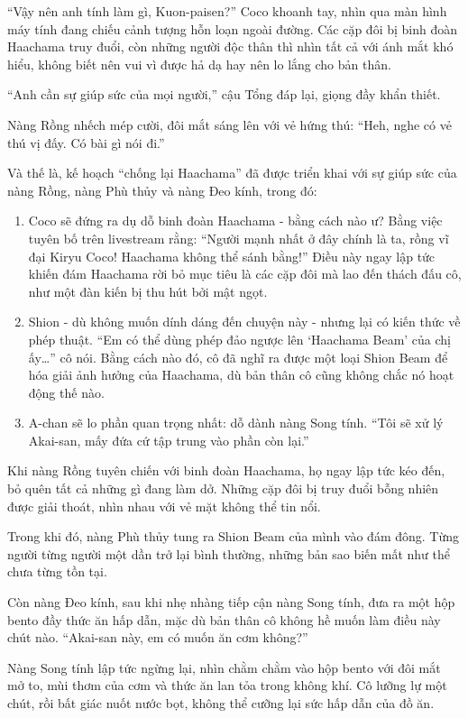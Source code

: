 \documentclass[../main.tex]{subfiles}
\begin{document}
``Vậy nên anh tính làm gì, Kuon-paisen?'' Coco khoanh tay, nhìn qua màn hình máy tính đang chiếu cảnh tượng hỗn loạn ngoài đường. Các cặp đôi bị binh đoàn Haachama truy đuổi, còn những người độc thân thì nhìn tất cả với ánh mắt khó hiểu, không biết nên vui vì được hả dạ hay nên lo lắng cho bản thân.

``Anh cần sự giúp sức của mọi người,'' cậu Tổng đáp lại, giọng đầy khẩn thiết.

Nàng Rồng nhếch mép cười, đôi mắt sáng lên với vẻ hứng thú: ``Heh, nghe có vẻ thú vị đấy. Có bài gì nói đi.''

Và thế là, kế hoạch ``chống lại Haachama'' đã được triển khai với sự giúp sức của nàng Rồng, nàng Phù thủy và nàng Đeo kính, trong đó:

\begin{enumerate}
  \item Coco sẽ đứng ra dụ dỗ binh đoàn Haachama - bằng cách nào ư? Bằng việc tuyên bố trên livestream rằng: ``Người mạnh nhất ở đây chính là ta, rồng vĩ đại Kiryu Coco! Haachama không thể sánh bằng!'' Điều này ngay lập tức khiến đám Haachama rời bỏ mục tiêu là các cặp đôi mà lao đến thách đấu cô, như một đàn kiến bị thu hút bởi mật ngọt.
  \item Shion - dù không muốn dính dáng đến chuyện này - nhưng lại có kiến thức về phép thuật. ``Em có thể dùng phép đảo ngược lên `Haachama Beam' của chị ấy\dots'' cô nói. Bằng cách nào đó, cô đã nghĩ ra được một loại Shion Beam để hóa giải ảnh hưởng của Haachama, dù bản thân cô cũng không chắc nó hoạt động thế nào.
  \item A-chan sẽ lo phần quan trọng nhất: dỗ dành nàng Song tính. ``Tôi sẽ xử lý Akai-san, mấy đứa cứ tập trung vào phần còn lại.''
\end{enumerate}

Khi nàng Rồng tuyên chiến với binh đoàn Haachama, họ ngay lập tức kéo đến, bỏ quên tất cả những gì đang làm dở. Những cặp đôi bị truy đuổi bỗng nhiên được giải thoát, nhìn nhau với vẻ mặt không thể tin nổi.

Trong khi đó, nàng Phù thủy tung ra Shion Beam của mình vào đám đông. Từng người từng người một dần trở lại bình thường, những bản sao biến mất như thể chưa từng tồn tại.

Còn nàng Đeo kính, sau khi nhẹ nhàng tiếp cận nàng Song tính, đưa ra một hộp bento đầy thức ăn hấp dẫn, mặc dù bản thân cô không hề muốn làm điều này chút nào. ``Akai-san này, em có muốn ăn cơm không?''

Nàng Song tính lập tức ngừng lại, nhìn chằm chằm vào hộp bento với đôi mắt mở to, mùi thơm của cơm và thức ăn lan tỏa trong không khí. Cô lưỡng lự một chút, rồi bất giác nuốt nước bọt, không thể cưỡng lại sức hấp dẫn của đồ ăn.
\end{document}
